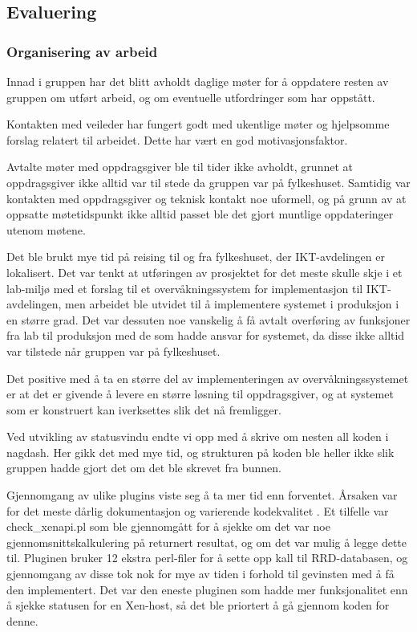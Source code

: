 \subsection{Evaluering}
\subsubsection{Organisering av arbeid}

Innad i gruppen har det blitt avholdt daglige møter for å oppdatere resten av gruppen om utført arbeid, og om eventuelle utfordringer som har oppstått. 

Kontakten med veileder har fungert godt med ukentlige møter og hjelpsomme forslag relatert til arbeidet. Dette har vært en god motivasjonsfaktor.

Avtalte møter med oppdragsgiver ble til tider ikke avholdt, grunnet at oppdragsgiver ikke alltid var til stede da gruppen var på fylkeshuset. Samtidig var kontakten med oppdragsgiver og teknisk kontakt noe uformell, og på grunn av at oppsatte møtetidspunkt ikke alltid passet ble det gjort muntlige oppdateringer utenom møtene.

Det ble brukt mye tid på reising til og fra fylkeshuset, der IKT-avdelingen er lokalisert. Det var tenkt at utføringen av prosjektet for det meste skulle skje i et lab-miljø med et forslag til et overvåkningssystem for implementasjon til IKT-avdelingen, men arbeidet ble utvidet til å implementere systemet i produksjon i en større grad. Det var dessuten noe vanskelig å få avtalt overføring av funksjoner fra lab til produksjon med de som hadde ansvar for systemet, da disse ikke alltid var tilstede når gruppen var på fylkeshuset. 

Det positive med å ta en større del av implementeringen av overvåkningssystemet er at det er givende å levere en større løsning til oppdragsgiver, og at systemet som er konstruert kan iverksettes slik det nå fremligger.

Ved utvikling av statusvindu endte vi opp med å skrive om nesten all koden i nagdash. Her gikk det med mye tid, og strukturen på koden ble heller ikke slik gruppen hadde gjort det om det ble skrevet fra bunnen. 

Gjennomgang av ulike plugins viste seg å ta mer tid enn forventet. Årsaken var for det meste dårlig dokumentasjon og varierende kodekvalitet . Et tilfelle var check\_xenapi.pl som ble gjennomgått for å sjekke om det var noe gjennomsnittskalkulering på returnert resultat, og om det var mulig å legge dette til. Pluginen bruker 12 ekstra perl-filer for å sette opp kall til RRD-databasen, og gjennomgang av disse tok nok for mye av tiden i forhold til gevinsten med å få den implementert. Det var den eneste pluginen som hadde mer funksjonalitet enn å sjekke statusen for en Xen-host, så det ble priortert å gå gjennom koden for denne. 

